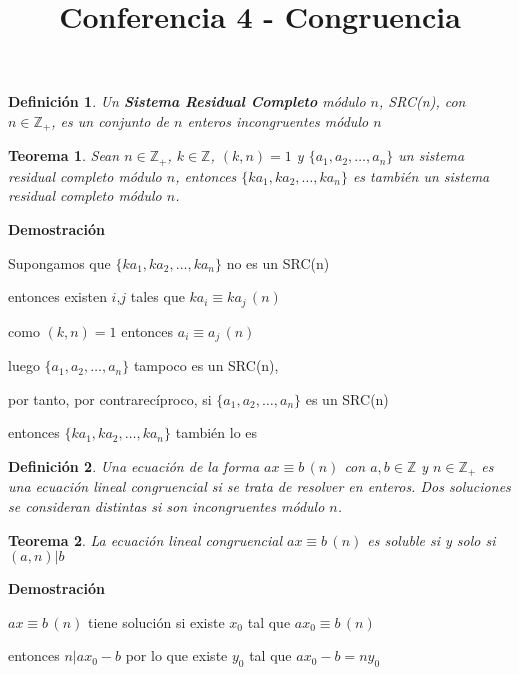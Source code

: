 \documentclass[a4paper,12pt]{report}
\title{Conferencia 4 - Congruencia}
\author{}
\newtheorem*{teo}{Teorema}
\newtheorem*{dfn}{Definición}
\begin{document}
\maketitle




\begin{dfn}
  Un \textbf{Sistema Residual Completo} módulo $n$, SRC(n), con $n\in\mathbb{Z}_+$, es un conjunto de $n$ enteros incongruentes módulo $n$
\end{dfn}



\begin{teo}
 Sean $n\in\mathbb{Z}_+$, $k\in\mathbb{Z}$, $(k,n)=1$ y $\{a_1,a_2,\dots,a_n\}$ un sistema residual completo módulo $n$, entonces $\{ka_1,ka_2,\dots,ka_n\}$ es también un sistema residual completo módulo $n$.
\end{teo}

\textbf{Demostración}

Supongamos que $\{ka_1,ka_2,\dots,ka_n\}$ no es un SRC(n)

entonces existen $i$,$j$ tales que $ka_i\equiv ka_j \, (n)$

como $(k,n)=1$ entonces $a_i\equiv a_j \, (n)$

luego $\{a_1,a_2,\dots,a_n\}$ tampoco es un SRC(n), 

por tanto, por contrarecíproco, si $\{a_1,a_2,\dots,a_n\}$ es un SRC(n) 

entonces $\{ka_1,ka_2,\dots,ka_n\}$ también lo es

\begin{dfn}
 Una ecuación de la forma $ax\equiv b \, (n)$ con $a,b\in\mathbb{Z}$ y $n\in\mathbb{Z}_+$ es una 
 ecuación lineal congruencial si se trata de resolver en enteros. Dos soluciones se consideran distintas si son incongruentes módulo $n$.
\end{dfn}

\begin{teo}
 La ecuación lineal congruencial $ax\equiv b \, (n)$ es soluble si y solo si $(a,n)|b$
\end{teo}

\textbf{Demostración}

$ax\equiv b \, (n)$ tiene solución si existe $x_0$ tal que $ax_0\equiv b \, (n)$

entonces $n|ax_0-b$ por lo que existe $y_0$ tal que $ax_0-b=ny_0$
\end{document}
